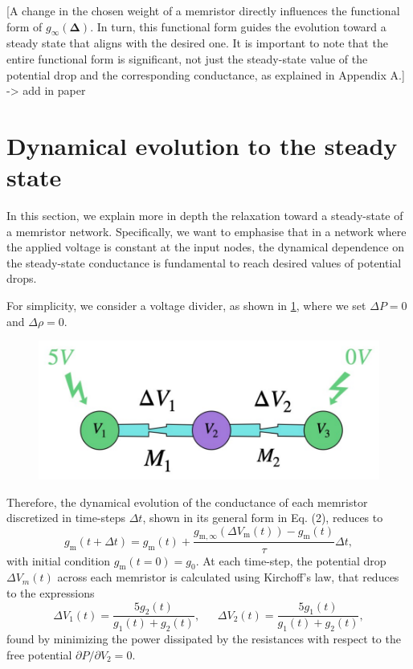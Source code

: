 \documentclass[reprint,superscriptaddress,prb,showkeys]{revtex4-2}
\newcommand{\m}{\text{m}} %
\newcommand{\brac}[1]{\left(#1 \right)} %
\begin{document}
\cleardoublepage
\appendix



[A change in the chosen weight of a memristor directly influences the functional form of $g_{\infty}(\boldsymbol{\Delta})$. In turn, this functional form guides the evolution toward a steady state that aligns with the desired one. It is important to note that the entire functional form is significant, not just the steady-state value of the potential drop and the corresponding conductance, as explained in Appendix A.] -> add in paper

\section{Dynamical evolution to the steady state \label{app:dyn_evol_steady_state}}
In this section, we explain more in depth the relaxation toward a steady-state of a memristor network. Specifically, we want to emphasise that in a network where the applied voltage is constant at the input nodes, the dynamical dependence on the steady-state conductance is fundamental to reach desired values of potential drops. 


For simplicity, we consider a voltage divider, as shown in \cref{fig:app_vd}, where we set $\Delta P = 0$ and $\Delta \rho = 0$. 
\begin{figure}[H]
    \centering
    \includegraphics[width=0.5\columnwidth]{plots/appendixA/app_vd.pdf}
    \caption{}
    \label{fig:app_vd}
\end{figure} 
Therefore, the dynamical evolution of the conductance of each memristor discretized in time-steps $\Delta t$, shown in its general form in Eq. (2), reduces to
\begin{equation}
    g_{\m}\brac{t + \Delta t} = g_{\m}\brac{t} +
     \frac{g_{\m,\infty}\brac{\Delta V_{\m}(t)}-g_{\m}\brac{t}}{\tau}\Delta t,
\label{eq:conduct}
\end{equation}
with initial condition $g_{\m}(t=0)=g_0$. At each time-step, the potential drop $\Delta V_{m}(t)$ across each memristor is calculated using Kirchoff's law, that reduces to the expressions
\begin{equation}
    \Delta V_1(t) = \frac{5 g_2(t)}{g_1(t)+g_2(t)}, \ \ \ \ \ \ \ \Delta V_2(t) = \frac{5 g_1(t)}{g_1(t)+g_2(t)},
    \label{eq:potentials}
\end{equation}
found by minimizing the power dissipated by the resistances with respect to the free potential $\partial P/\partial V_2=0$.
\end{document}
